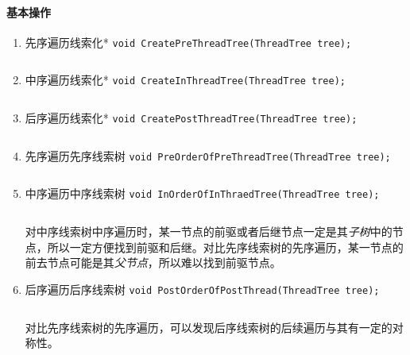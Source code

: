 \documentclass{ctexart}
\begin{document}
\paragraph{基本操作}
\begin{enumerate}
    \item 先序遍历线索化* \texttt{void CreatePreThreadTree(ThreadTree tree);}
        \inputminted{c}{codes/create-preorder-thread-tree.c}

    \item 中序遍历线索化* \texttt{void CreateInThreadTree(ThreadTree tree);}
        \inputminted{c}{codes/create-inorder-thread-tree.c}

    \item 后序遍历线索化* \texttt{void CreatePostThreadTree(ThreadTree tree);}
        \inputminted{c}{codes/create-postorder-thread-tree.c}

    \item 先序遍历先序线索树 \texttt{void PreOrderOfPreThreadTree(ThreadTree tree);}
        \inputminted{c}{codes/preorder-of-prethread-tree.c}

    \item 中序遍历中序线索树 \texttt{void InOrderOfInThraedTree(ThreadTree tree);}
        \inputminted{c}{codes/inorder-of-inthread-tree.c}
        对中序线索树中序遍历时，某一节点的前驱或者后继节点一定是其\emph{子树}中的节点，所以一定方便找到前驱和后继。对比先序线索树的先序遍历，某一节点的前去节点可能是其\emph{父节点}，所以难以找到前驱节点。

    \item 后序遍历后序线索树 \texttt{void PostOrderOfPostThread(ThreadTree tree);}
        \inputminted{c}{codes/postorder-of-postthread-tree.c}
        对比先序线索树的先序遍历，可以发现后序线索树的后续遍历与其有一定的对称性。
\end{enumerate}
\end{document}
